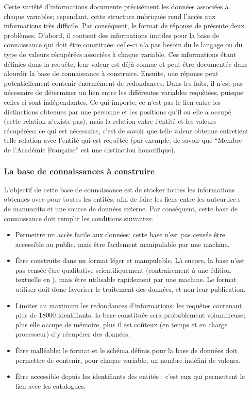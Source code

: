 Cette variété d'informations documente précisément les données associées à chaque variables; cependant, cette structure imbriquée rend l'accès aux informations très difficile. Par conséquent, le format de réponse de \sparql{} présente deux problèmes. D'abord, il contient des informations inutiles pour la base de connaissance qui doit être constituée: celle-ci n'a pas besoin du le langage ou du type de valeurs récupérées associées à chaque variable. Ces informations étant définies dans la requête, leur valeur est déjà connue et peut être documentée dans alourdir la base de connaissance à construire. Ensuite, une réponse \sparql{} peut potentiellement contenir énormément de redondances. Dans les faits, il n'est pas nécessaire de déterminer un lien entre les différentes variables requêtées, puisque celles-ci sont indépendantes. Ce qui importe, ce n'est pas le lien entre les distinctions obtenues par une personne et les positions qu'il ou elle a occupé (cette relation n'existe pas), mais la relation entre l'entité et les valeurs récupérées: ce qui est nécessaire, c'est de savoir que telle valeur obtenue entretient telle relation avec l'entité qui est requêtée (par exemple, de savoir que \enquote{Membre de l'Académie Française} est une distinction honorifique).

\subsubsection{La base de connaissances à construire}
L'objectif de cette base de connaissance est de stocker toutes les informations obtenues avec \sparql{} pour toutes les entités, afin de faire les liens entre les auteur.ice.s de manuscrits et une source de données externe. Par conséquent, cette base de connaissance doit remplir les conditions suivantes:

\begin{itemize}
	\item Permettre un accès facile aux données: cette base n'est pas censée être accessible au public, mais être facilement manipulable par une machine.
	\item Être construite dans un format léger et manipulable. Là encore, la base n'est pas censée être qualitative scientifiquement (contrairement à une édition textuelle en \tei{}), mais être utilisable rapidement par une machine. Le format utiliser doit donc favoriser le traitement des données, et non leur publication.
	\item Limiter au maximum les redondances d'informations: les requêtes contenant plus de 18000 identifiants, la base constituée sera probablement volumineuse; plus elle occupe de mémoire, plus il est coûteux (en temps et en charge processeur) d'y récupérer des données.
	\item Être malléable: le format et le schéma définis pour la base de données doit permettre de contenir, pour chaque variable, un nombre indéfini de valeurs.
	\item Être accessible depuis les identifiants des entités \wkd{}: c'est eux qui permettent le lien avec les catalogues.
\end{itemize}

